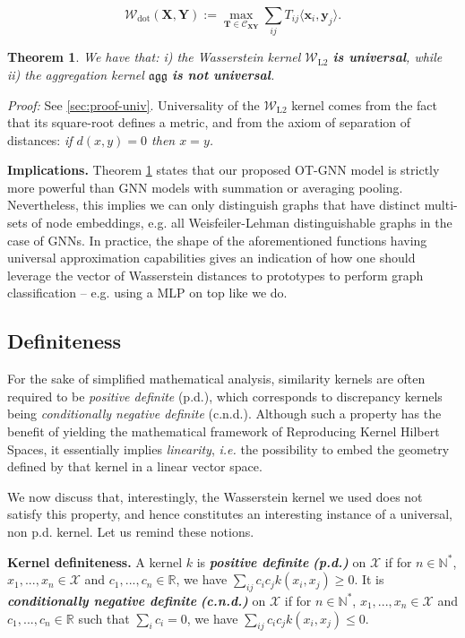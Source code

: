 \documentclass[letterpaper]{article} \usepackage{aaai22}  \usepackage{times}  \usepackage{helvet}  \usepackage{courier}  \usepackage[hyphens]{url}  \usepackage{graphicx} \urlstyle{rm} \def\UrlFont{\rm}  \usepackage{natbib}  \usepackage{caption} \DeclareCaptionStyle{ruled}{labelfont=normalfont,labelsep=colon,strut=off} \frenchspacing  \setlength{\pdfpagewidth}{8.5in}  \setlength{\pdfpageheight}{11in}  \usepackage{algorithm}
\newtheorem{theorem}{Theorem}
\newcommand{\x}{{\mathbf x}}
\newcommand{\T}{{\mathbf T}}
\newcommand{\X}{{\mathbf X}}
\newcommand{\Was}{{\mathcal W}}
\begin{document}
\begin{equation}
     \Was_{\mathrm{dot}}(\X,\mathbf Y) := \max_{\T\in\mathcal{C}_{\X\mathbf Y}}\sum_{ij} T_{ij}\langle \x_i,\mathbf y_j\rangle.
 \end{equation}


\begin{theorem} 
\label{thm:univ}
We have that: i) the Wasserstein kernel $\Was_{\mathrm{L2}}$ \textbf{is universal}, while ii) the aggregation kernel $\mathfrak{agg}$ \textbf{is not universal}. 
\end{theorem}
\textit{Proof:} See \cref{sec:proof-univ}. Universality of the $\Was_{\mathrm{L2}}$ kernel comes from the fact that its square-root defines a metric, and from the axiom of separation of distances: \textit{if $d(x,y)=0$ then $x=y$.}

\textbf{Implications. } Theorem \ref{thm:univ} states that our proposed OT-GNN model is strictly more powerful than GNN models with summation or averaging pooling. Nevertheless, this implies we can only distinguish graphs that have distinct multi-sets of node embeddings, e.g. all Weisfeiler-Lehman distinguishable graphs in the case of GNNs. In practice, the shape of the aforementioned functions having universal approximation capabilities gives an indication of how one should leverage the vector of Wasserstein distances to prototypes to perform graph classification -- e.g. using a MLP on top like we do.


\subsection{Definiteness}

For the sake of simplified mathematical analysis, similarity kernels are often required to be \textit{positive definite} (p.d.), which corresponds to discrepancy kernels being \textit{conditionally negative definite} (c.n.d.). Although such a property has the benefit of yielding the mathematical framework of Reproducing Kernel Hilbert Spaces, it essentially implies \textit{linearity}, \textit{i.e.} the possibility to embed the geometry defined by that kernel in a linear vector space. 

We now discuss that, interestingly, the Wasserstein kernel we used does not satisfy this property, and hence constitutes an interesting instance of a universal, non p.d. kernel. Let us remind these notions.

\noindent\textbf{Kernel definiteness.} A kernel $k$ is \textbf{\textit{positive definite}} \textit{\textbf{(p.d.)}} on $\mathcal{X}$ if for $n\in\mathbb{N}^*$, $x_1,...,x_n\in\mathcal{X}$ and $c_1,...,c_n\in\mathbb{R}$, we have $\sum_{ij}c_i c_j k(x_i,x_j)\geq 0$. It is \textbf{\textit{conditionally negative definite}} \textit{\textbf{(c.n.d.)}} on $\mathcal{X}$ if for $n\in\mathbb{N}^*$, $x_1,...,x_n\in\mathcal{X}$ and $c_1,...,c_n\in\mathbb{R}$ such that $\sum_i c_i=0$, we have $\sum_{ij}c_i c_j k(x_i,x_j)\leq 0$. 
\end{document}
